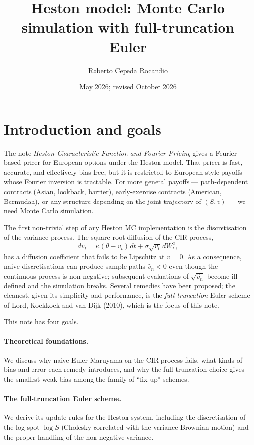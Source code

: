 \documentclass[11pt]{article}
\title{Heston model: Monte Carlo simulation with full-truncation Euler}
\author{Roberto Cepeda Rocandio}
\date{May 2026; revised October 2026}
\theoremstyle{plain}
\theoremstyle{definition}
\theoremstyle{remark}
\begin{document}
\maketitle
\tableofcontents
\bigskip

\section{Introduction and goals}

The note \emph{Heston Characteristic Function and Fourier Pricing} gives a Fourier-based pricer for European options under the Heston model. That pricer is fast, accurate, and effectively bias-free, but it is restricted to European-style payoffs whose Fourier inversion is tractable. For more general payoffs --- path-dependent contracts (Asian, lookback, barrier), early-exercise contracts (American, Bermudan), or any structure depending on the joint trajectory of $(S, v)$ --- we need Monte Carlo simulation.

The first non-trivial step of any Heston MC implementation is the discretisation of the variance process. The square-root diffusion of the CIR process,
\[
    dv_t = \kappa(\theta - v_t)\,dt + \sigma\sqrt{v_t}\,dW^2_t,
\]
has a diffusion coefficient that fails to be Lipschitz at $v = 0$. As a consequence, naive discretisations can produce sample paths $\hat v_n < 0$ even though the continuous process is non-negative; subsequent evaluations of $\sqrt{\hat v_n}$ become ill-defined and the simulation breaks. Several remedies have been proposed; the cleanest, given its simplicity and performance, is the \emph{full-truncation} Euler scheme of Lord, Koekkoek and van Dijk (2010), which is the focus of this note.

This note has four goals.

\paragraph{Theoretical foundations.} We discuss why naive Euler-Maruyama on the CIR process fails, what kinds of bias and error each remedy introduces, and why the full-truncation choice gives the smallest weak bias among the family of ``fix-up'' schemes.

\paragraph{The full-truncation Euler scheme.} We derive its update rules for the Heston system, including the discretisation of the log-spot $\log S$ (Cholesky-correlated with the variance Brownian motion) and the proper handling of the non-negative variance.
\end{document}
